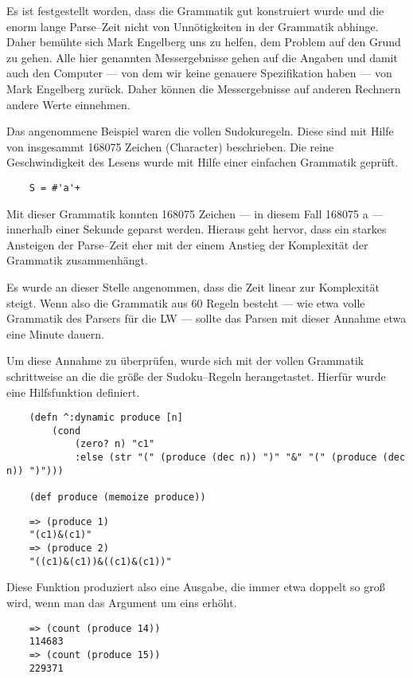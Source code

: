 \documentclass[ngerman,a4paper,abstracton,open=right,twoside=false,toc=listofnumbered,bibtotocnumbered]{scrreprt}
\begin{document}
Es ist festgestellt worden, dass die Grammatik gut konstruiert wurde und die enorm lange Parse--Zeit nicht von Unnötigkeiten in der Grammatik abhinge. Daher bemühte sich Mark Engelberg uns zu helfen, dem Problem auf den Grund zu gehen. Alle hier genannten Messergebnisse gehen auf die Angaben und damit auch den Computer --- von dem wir keine genauere Spezifikation haben --- von Mark Engelberg zurück. Daher können die Messergebnisse auf anderen Rechnern andere Werte einnehmen.

Das angenommene Beispiel waren die vollen Sudokuregeln. Diese sind mit Hilfe von insgesammt 168075 Zeichen (Character) beschrieben. Die reine Geschwindigkeit des Lesens wurde mit Hilfe einer einfachen Grammatik geprüft.

\begin{lstlisting}
	S = #'a'+
\end{lstlisting}

Mit dieser Grammatik konnten 168075 Zeichen --- in diesem Fall 168075 \glqq{}a\grqq{} --- innerhalb einer Sekunde geparst werden. Hieraus geht hervor, dass ein starkes Ansteigen der Parse--Zeit eher mit der einem Anstieg der Komplexität der Grammatik zusammenhängt.

Es wurde an dieser Stelle angenommen, dass die Zeit linear zur Komplexität steigt. Wenn also die Grammatik aus 60 Regeln besteht --- wie etwa volle Grammatik des Parsers für die LW --- sollte das Parsen mit dieser Annahme etwa eine Minute dauern.

Um diese Annahme zu überprüfen, wurde sich mit der vollen Grammatik schrittweise an die die größe der Sudoku--Regeln herangetastet. Hierfür wurde eine Hilfsfunktion definiert.

\begin{lstlisting}
	(defn ^:dynamic produce [n]
		(cond
			(zero? n) "c1"
			:else (str "(" (produce (dec n)) ")" "&" "(" (produce (dec n)) ")")))

	(def produce (memoize produce))
\end{lstlisting}

\begin{lstlisting}
	=> (produce 1)
	"(c1)&(c1)"
	=> (produce 2)
	"((c1)&(c1))&((c1)&(c1))"
\end{lstlisting}

Diese Funktion produziert also eine Ausgabe, die immer etwa doppelt so groß wird, wenn man das Argument um eins erhöht.

\begin{lstlisting}
	=> (count (produce 14))
	114683
	=> (count (produce 15))
	229371
\end{lstlisting}
\end{document}
